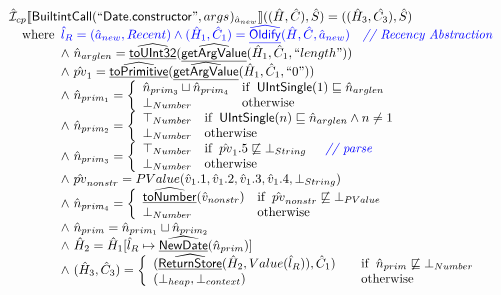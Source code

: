 \[\begin{array}{l}
\aI _{cp}\lbr \SF{BuiltintCall}(``\SF{Date.constructor}",args_{})_{\hat{a}_{new}}\rbr((\hat{H},\hat{C}), \hat{S})
  = ((\hat{H}_3, \hat{C_3}), \hat{S})\\
\quad\wherec{
  \inblue\hat{l}_{R} = (\hat{a}_{new}, Recent)
  \land \inblue (\hat{H}_1, \hat{C}_1) = \ahf{Oldify}(\hat{H}, \hat{C}, \hat{a}_{new})
     \quad\comment{{\inblue // Recency Abstraction}}\\
  \land\ \hat{n}_{arglen} = \ahf{toUInt32}(\ahf{getArgValue}(\hat{H}_1, \hat{C}_1, ``length"))\\
  \land\ \hat{pv}_1 = \ahf{toPrimitive}(\ahf{getArgValue}(\hat{H}_1, \hat{C}_1, ``0"))\\
  \land\ \hat{n}_{prim_1} = \left\{\begin{array}{ll}
      \hat{n}_{prim_3} \sqcup \hat{n}_{prim_4}& \ifc{\SF{UIntSingle}(1) \sqsubseteq \hat{n}_{arglen}}\\
      \bot_{Number} & \owc\
    \end{array}\right.\\
  \land\ \hat{n}_{prim_2} = \left\{\begin{array}{ll}
      \top_{Number} & \ifc{\SF{UIntSingle}(n) \sqsubseteq \hat{n}_{arglen} \land n \neq 1}\\
      \bot_{Number} & \owc\
    \end{array}\right.\\
  \land\ \hat{n}_{prim_3} = \left\{\begin{array}{ll}
      \top_{Number} & \ifc{\hat{pv}_1.5 \not\sqsubseteq \bot_{String}}
        \quad\comment{{\inblue // parse}}\\
      \bot_{Number} & \owc\
    \end{array}\right.\\
  \land\ \hat{pv}_{nonstr} = PValue(\hat{v}_1.1,\hat{v}_1.2,\hat{v}_1.3,\hat{v}_1.4,\bot_{String})\\
  \land\ \hat{n}_{prim_4} = \left\{\begin{array}{ll}
      \ahf{toNumber}(\hat{v}_{nonstr}) & \ifc{\hat{pv}_{nonstr} \not\sqsubseteq \bot_{PValue}}\\
      \bot_{Number} & \owc\
    \end{array}\right.\\
  \land\ \hat{n}_{prim} = \hat{n}_{prim_1} \sqcup \hat{n}_{prim_2}\\
  \land\ \hat{H}_2 = \hat{H}_1[\hat{l}_R \mapsto \ahf{NewDate}(\hat{n}_{prim})]\\
  \land\ (\hat{H}_3, \hat{C}_3) = 
    \left\{\begin{array}{l@{\quad\quad}l}
      (\ahf{ReturnStore}(\hat{H}_2, Value(\hat{l}_R)), \hat{C}_1)
      & \ifc{\hat{n}_{prim} \not\sqsubseteq \bot_{Number}}\\
      (\bot_{heap}, \bot_{context}) & \owc \\
    \end{array}\right.\\
  }\\
\\\\



\end{array}\]
